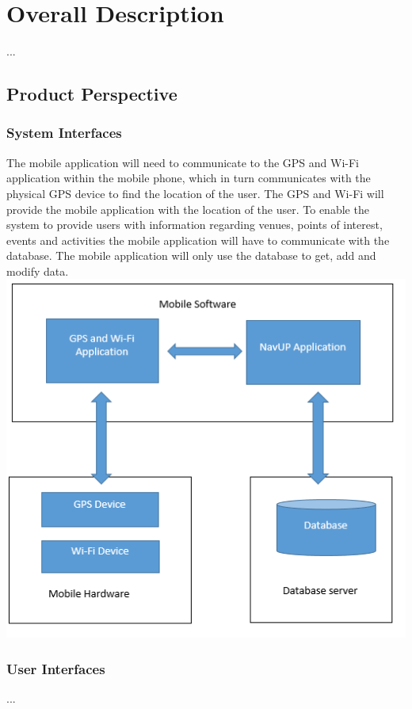 \documentclass[english]{article}
\begin{document}
	\section{Overall Description}
			...
		
		\subsection{Product Perspective}
			
				\subsubsection{System Interfaces}
						 The mobile application will need to communicate to the GPS and Wi-Fi application within the mobile phone, which in turn communicates with the physical GPS device to find the location of the user. The GPS and Wi-Fi will provide the mobile application with the location of the user.
To enable the system to provide users with information regarding venues, points of interest, events and activities the mobile application will have to communicate with the database. The mobile application will only use the database to get, add and modify data.
				\includegraphics{Block Diagram.png}

				\subsubsection{User Interfaces}
						...
\end{document}
